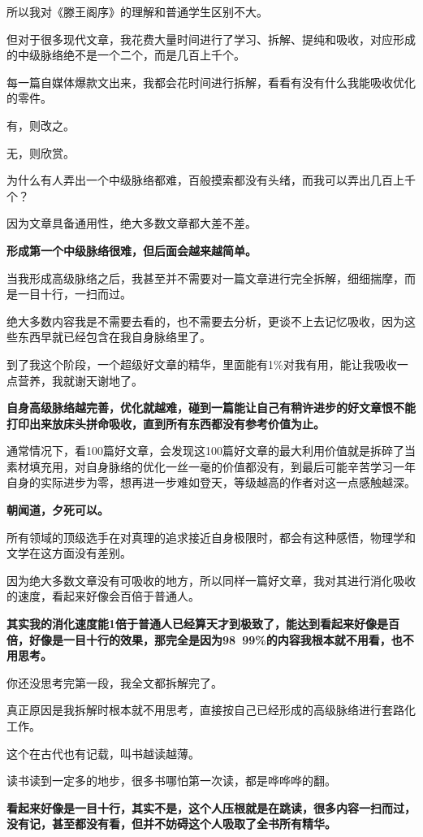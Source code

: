 \documentclass[UTF8, 11pt, oneside]{ctexart}
\newcommand{\zd}[1]{\textbf{\textcolor[RGB]{123,12,0}{#1}}} %
\begin{document}
所以我对《滕王阁序》的理解和普通学生区别不大。

但对于很多现代文章，我花费大量时间进行了学习、拆解、提纯和吸收，对应形成的中级脉络绝不是一个二个，而是几百上千个。

每一篇自媒体爆款文出来，我都会花时间进行拆解，看看有没有什么我能吸收优化的零件。

有，则改之。

无，则欣赏。

为什么有人弄出一个中级脉络都难，百般摸索都没有头绪，而我可以弄出几百上千个？

因为文章具备通用性，绝大多数文章都大差不差。

\zd{形成第一个中级脉络很难，但后面会越来越简单。}

当我形成高级脉络之后，我甚至并不需要对一篇文章进行完全拆解，细细揣摩，而是一目十行，一扫而过。

绝大多数内容我是不需要去看的，也不需要去分析，更谈不上去记忆吸收，因为这些东西早就已经包含在我自身脉络里了。

到了我这个阶段，一个超级好文章的精华，里面能有1\%对我有用，能让我吸收一点营养，我就谢天谢地了。

\zd{自身高级脉络越完善，优化就越难，碰到一篇能让自己有稍许进步的好文章恨不能打印出来放床头拼命吸收，直到所有东西都没有参考价值为止。}

通常情况下，看100篇好文章，会发现这100篇好文章的最大利用价值就是拆碎了当素材填充用，对自身脉络的优化一丝一毫的价值都没有，到最后可能辛苦学习一年自身的实际进步为零，想再进一步难如登天，等级越高的作者对这一点感触越深。

\zd{朝闻道，夕死可以。}

所有领域的顶级选手在对真理的追求接近自身极限时，都会有这种感悟，物理学和文学在这方面没有差别。

因为绝大多数文章没有可吸收的地方，所以同样一篇好文章，我对其进行消化吸收的速度，看起来好像会百倍于普通人。

\zd{其实我的消化速度能1倍于普通人已经算天才到极致了，能达到看起来好像是百倍，好像是一目十行的效果，那完全是因为98~99\%的内容我根本就不用看，也不用思考。}

你还没思考完第一段，我全文都拆解完了。

真正原因是我拆解时根本就不用思考，直接按自己已经形成的高级脉络进行套路化工作。

这个在古代也有记载，叫书越读越薄。

读书读到一定多的地步，很多书哪怕第一次读，都是哗哗哗的翻。

\zd{看起来好像是一目十行，其实不是，这个人压根就是在跳读，很多内容一扫而过，没有记，甚至都没有看，但并不妨碍这个人吸取了全书所有精华。}
\end{document}
